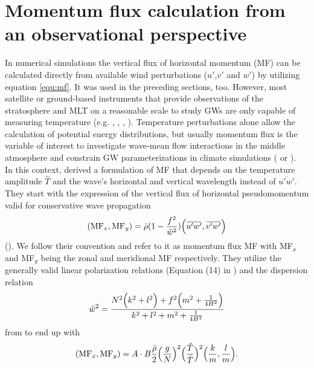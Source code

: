 
\section{Momentum flux calculation from an observational perspective}
\label{sec:3D_mf}
In numerical simulations the vertical flux of horizontal momentum (MF) can be calculated directly from available wind perturbations ($u'$,$v'$ and $w'$) by utilizing equation \ref{equ:mf}. It was used in the preceding sections, too. However, most satellite or ground-based instruments that provide observations of the stratosphere and MLT on a reasonable scale to study GWs are only capable of measuring temperature (e.g. \cite{wu_satellite_1996}, \cite[]{ern_absolute_2004}, \cite{hindley_gravity_2019}, \cite{kaifler_compact_2021}). Temperature perturbations alone allow the calculation of potential energy distributions, but usually momentum flux is the variable of interest to investigate wave-mean flow interactions in the middle atmosphere and constrain GW parameterizations in climate simulations (\cite[]{geller_comparison_2013} or \cite[]{kim_overview_2003}). \\
In this context, \textcite[]{ern_absolute_2004} derived a formulation of MF that depends on the temperature amplitude $\hat{T}$ and the wave's horizontal and vertical wavelength instead of $\overbar{u'w'}$. They start with the expression of the vertical flux of horizontal pseudomomentum valid for conservative wave propagation
\begin{equation}
    (\mathrm{MF}_x, \mathrm{MF}_y) = \bar{\rho} (1-\frac{f^2}{\hat{w}^2}) \Bigl(\overbar{u'w'},\overbar{v'w'}\Bigr) 
    \label{equ:ps-mf}
\end{equation}
(\cite[]{fritts_gravity_2003}). We follow their convention and refer to it as momentum flux MF with MF$_x$ and MF$_y$ being the zonal and meridional MF respectively. They utilize the generally valid linear polarization relations (Equation (14) in \textcite[]{fritts_gravity_2003}) and the dispersion relation
\begin{equation}
    \hat{w}^2 = \frac{N^2 \Bigl(k^2+l^2\Bigr) + f^2 \Bigl(m^2 + \frac{1}{4H^2}\Bigr)}{k^2+l^2+m^2+\frac{1}{4H^2}}
    \label{equ_lid:dispersion_noAss}
\end{equation}
from \textcite[]{fritts_gravity_2003} to end up with
\begin{equation}
    (\mathrm{MF}_x, \mathrm{MF}_y) = A \cdot B \frac{\bar{\rho}}{2} \Bigl(\frac{g}{N}\Bigr)^2 {\Bigl(\frac{\hat{T}}{\bar{T}}\Bigr)^2} \Bigl(\frac{k}{m},\frac{l}{m}\Bigr).
    \label{equ:mf-tp}
\end{equation}
